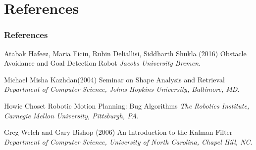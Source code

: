 \documentclass{beamer}
\begin{document}
\section{References}
\begin{frame}
\frametitle{References}
\footnotesize{
\begin{thebibliography}{99} %
 Atabak Hafeez, Maria Ficiu, Rubin Deliallisi, Siddharth Shukla (2016)
\newblock Obstacle Avoidance and Goal Detection Robot
\newblock \emph{Jacobs University Bremen}.

 Michael Misha Kazhdan(2004)
\newblock Seminar on Shape Analysis and Retrieval
\newblock \emph{Department of Computer Science,
Johns Hopkins University, Baltimore, MD}.

 Howie Choset
\newblock Robotic Motion Planning: Bug Algorithms
\newblock \emph{The Robotics Institute,
Carnegie Mellon University, Pittsburgh, PA}.


 Greg Welch and Gary Bishop (2006)
\newblock An Introduction to the Kalman Filter
\newblock \emph{Department of Computer Science,
University of North Carolina, Chapel Hill, NC}.
\end{thebibliography}
}
\end{frame}

\end{document}
